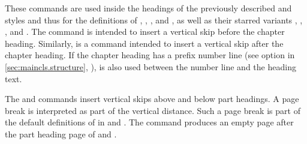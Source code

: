\begin{Declaration}
\end{Declaration}
These commands are used inside the headings of the
previously described  and  styles and thus for
the definitions of ,
,
, and
, as well as their starred
variants ,
,
, and
.
The  command is intended to insert a
vertical skip before the chapter heading. Similarly,
 is a command intended to insert a vertical
skip after the chapter heading. If the chapter heading has a prefix number line (see option
 in \autoref{sec:maincls.structure},
), 
is also used between the number line and the heading text.

The  and  commands insert
vertical skips above and below part headings. A page break is interpreted as
part of the vertical distance. Such a page break is part of the default
definitions of  in
 and
. The
 command produces an empty page after the part heading page
of  and .

